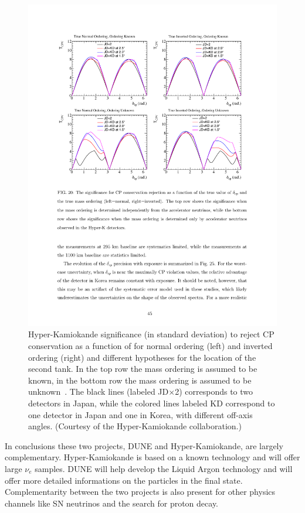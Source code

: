 \begin{figure} [htbp!]
\begin{center}
\includegraphics[width=15cm]{figures/hk_cpv_sensi.pdf}
\caption{\label{fig:hkcpv} Hyper-Kamiokande significance (in standard deviation) to reject CP conservation as a function of \dcp for normal ordering (left) and inverted ordering (right) and different hypotheses for the location of the second tank. In the top row the mass ordering is assumed to be known, in the bottom row the mass ordering is assumed to be unknown~\cite{Abe:2016ero}. The black lines (labeled JD$\times$2) corresponds to two detectors in Japan, while the colored lines labeled KD correspond to one detector in Japan and one in Korea, with different off-axis angles. (Courtesy of the Hyper-Kamiokande collaboration.)}
\end{center}
\end{figure}

In conclusions these two projects, DUNE and Hyper-Kamiokande, are largely complementary. Hyper-Kamiokande is based on a known technology and will offer large $\nu_e$ samples. DUNE will help develop the Liquid Argon technology and will offer more detailed informations on the particles in the final state. Complementarity between the two projects is also present for other physics channels like SN neutrinos and the search for proton decay.  

